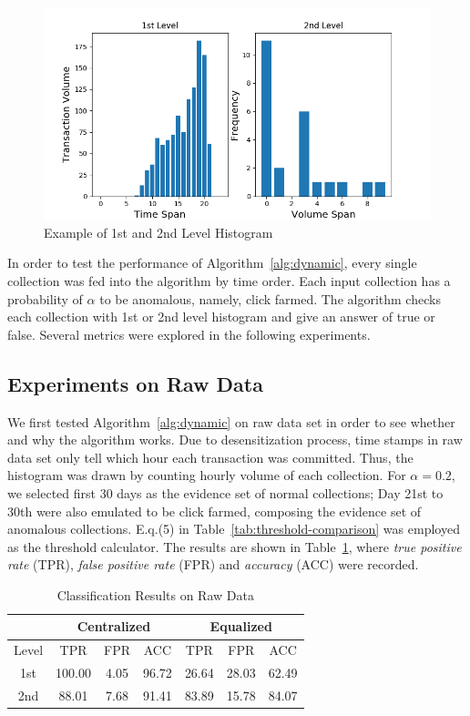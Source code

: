 \documentclass[10pt,conference,letterpaper]{IEEEtran}
\begin{document}
			\begin{figure}[!t]
				\centering
				\includegraphics[width=\linewidth]{fig/HistogramExample.png}
				\caption{Example of 1st and 2nd Level Histogram}
				\label{fig:histogram-example}
			\end{figure}
	
			In order to test the performance of Algorithm~\ref{alg:dynamic}, every single collection was fed into the algorithm by time order. Each input collection has a probability of $\alpha$ to be anomalous, namely, click farmed. The algorithm checks each collection with 1st or 2nd level histogram and give an answer of true or false. Several metrics were explored in the following experiments.
			
		\subsection{Experiments on Raw Data}\label{sec:exp-raw}
			We first tested Algorithm~\ref{alg:dynamic} on raw data set in order to see whether and why the algorithm works. Due to desensitization process, time stamps in raw data set only tell which hour each transaction was committed. Thus, the histogram was drawn by counting hourly volume of each collection. For $\alpha = 0.2$, we selected first 30 days as the evidence set of normal collections; Day 21st to 30th were also emulated to be click farmed, composing the evidence set of anomalous collections. E.q.(5) in Table~\ref{tab:threshold-comparison} was employed as the threshold calculator. The results are shown in Table~\ref{tab:result-raw-1st}, where \textit{true positive rate} (TPR), \textit{false positive rate} (FPR) and \textit{accuracy} (ACC) were recorded.
	
			\begin{table}[!ht]
				\centering
				\caption{Classification Results on Raw Data}
				\label{tab:result-raw-1st}
				\begin{tabular}{|c|c|c|c|c|c|c|}
					\hline
					& \multicolumn{3}{c|}{Centralized} & \multicolumn{3}{c|}{Equalized}\\
					\hline
					Level & TPR & FPR & ACC & TPR & FPR & ACC\\
					\hline
					1st & 100.00 & 4.05 & 96.72 & 26.64 & 28.03 & 62.49\\
					\hline
					2nd & 88.01 & 7.68 & 91.41 & 83.89 & 15.78 & 84.07\\
					\hline
				\end{tabular}
			\end{table}
			
\end{document}
